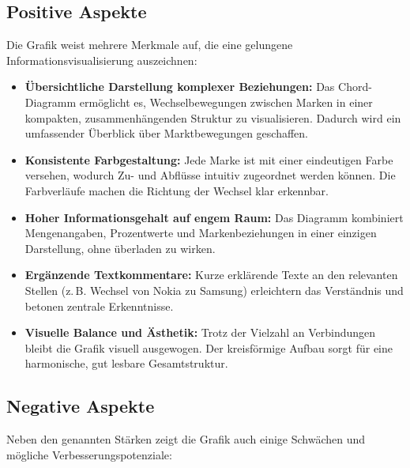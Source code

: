 \documentclass[a4paper,12pt]{article}
\begin{document}
\subsection{Positive Aspekte}
Die Grafik weist mehrere Merkmale auf, die eine gelungene Informationsvisualisierung auszeichnen:

\begin{itemize}[label=--]
    \item \textbf{Übersichtliche Darstellung komplexer Beziehungen:} 
    Das Chord-Diagramm ermöglicht es, Wechselbewegungen zwischen Marken in einer kompakten, zusammenhängenden Struktur zu visualisieren. 
    Dadurch wird ein umfassender Überblick über Marktbewegungen geschaffen.
    
    \item \textbf{Konsistente Farbgestaltung:} 
    Jede Marke ist mit einer eindeutigen Farbe versehen, wodurch Zu- und Abflüsse intuitiv zugeordnet werden können. 
    Die Farbverläufe machen die Richtung der Wechsel klar erkennbar.
    
    \item \textbf{Hoher Informationsgehalt auf engem Raum:} 
    Das Diagramm kombiniert Mengenangaben, Prozentwerte und Markenbeziehungen in einer einzigen Darstellung, ohne überladen zu wirken.
    
    \item \textbf{Ergänzende Textkommentare:} 
    Kurze erklärende Texte an den relevanten Stellen (z.\,B. Wechsel von Nokia zu Samsung) erleichtern das Verständnis und betonen zentrale Erkenntnisse.
    
    \item \textbf{Visuelle Balance und Ästhetik:} 
    Trotz der Vielzahl an Verbindungen bleibt die Grafik visuell ausgewogen. 
    Der kreisförmige Aufbau sorgt für eine harmonische, gut lesbare Gesamtstruktur.
\end{itemize}

\subsection{Negative Aspekte}
Neben den genannten Stärken zeigt die Grafik auch einige Schwächen und mögliche Verbesserungspotenziale:
\end{document}
